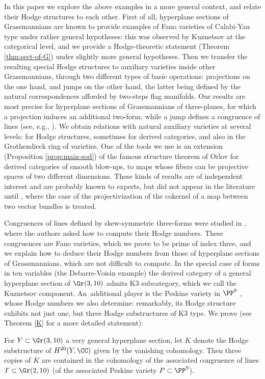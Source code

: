 In this paper we explore the above examples in a more general context, and
relate their Hodge structures to each other.
First of all, hyperplane sections of Grassmannians are known to provide examples of Fano varieties
of Calabi-Yau type under
rather general hypotheses: this was observed by Kuznetsov \cite{kuz-fractional} at the categorical level, and we
provide a Hodge-theoretic statement (Theorem \ref{thm:sect-of-G})
under slightly more general hypotheses.
Then we transfer the resulting special Hodge structures to auxiliary varieties inside
other Grassmannians, through two different types of basic operations: projections on the one
hand, and jumps on the other hand, the latter being defined by the natural correspondences
afforded by two-steps flag manifolds. Our results are most precise for hyperplane sections
of Grassmannians of three-planes, for which a projection induces an additional two-form, while
a jump defines a congruence of lines (see, e.g., \cite{dpfmr}). We obtain relations with natural auxiliary varieties
at several levels: for Hodge structures, sometimes for derived categories, and also in the
Grothendieck ring of varieties. One of the tools we use is an extension (Proposition \ref{prop:main-sod}) of the famous
structure theorem of Orlov for derived categories of smooth blow-ups, to maps whose
fibers can be projective spaces of two different dimensions. These kinds of results are of
independent interest and are probably known
to experts, but did not appear in the literature until \cite{Jiang-Leung}, where the case of
the projectivization of the cokernel of a map between two vector bundles is treated.

Congruences of lines defined by skew-symmetric three-forms were studied in \cite{dpfmr},
where the authors asked how to compute their Hodge numbers. These congruences are Fano
varieties, which we prove to be prime of index three, and we explain how to deduce their
Hodge numbers from those of hyperplane sections of \hbox{Grassmannians}, which are not difficult
to compute. In the special case
of forms in ten variables (the Debarre-Voisin example) the derived category of a general hyperplane section of $\Gr(3,10)$
\hbox{admits} K3 subcategory, which we call the Kuznetsov component. An~additional player
is the Peskine variety in $\PP^9$ \cite{dpfmr}, whose Hodge numbers we also determine: remarkably, its
Hodge structure exhibits not just one, but three Hodge substructures of K3 type.
We prove (see Theorem \ref{K} for a more detailed statement):

\begin{theorem*}
For $Y\subset \Gr(3,10)$ a very general hyperplane section, let $K$ denote the Hodge substructure of $H^{20}(Y,\CC)$ given by the vanishing cohomology. Then three copies of $K$ are contained
in the cohomology of the associated congruence of lines $T\subset \Gr(2,10)$ (\resp of the associated Peskine variety $P\subset\PP^9$).
\end{theorem*}

